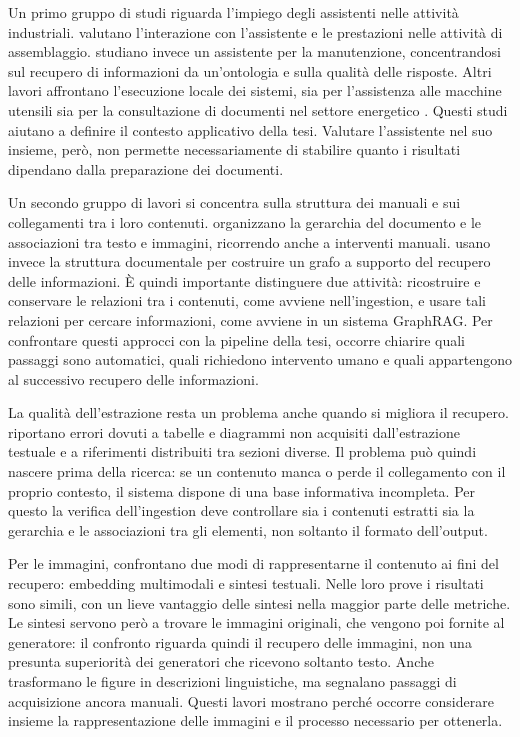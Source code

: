 Un primo gruppo di studi riguarda l'impiego degli assistenti nelle attività industriali. \textcite{colabianchi2024assessment} valutano l'interazione con l'assistente e le prestazioni nelle attività di assemblaggio. \textcite{ludwig2025ontology} studiano invece un assistente per la manutenzione, concentrandosi sul recupero di informazioni da un'ontologia e sulla qualità delle risposte. Altri lavori affrontano l'esecuzione locale dei sistemi, sia per l'assistenza alle macchine utensili sia per la consultazione di documenti nel settore energetico \parencite{cho2026onpremise,lee2025security}. Questi studi aiutano a definire il contesto applicativo della tesi. Valutare l'assistente nel suo insieme, però, non permette necessariamente di stabilire quanto i risultati dipendano dalla preparazione dei documenti.

Un secondo gruppo di lavori si concentra sulla struttura dei manuali e sui collegamenti tra i loro contenuti. \textcite{nam2025manual} organizzano la gerarchia del documento e le associazioni tra testo e immagini, ricorrendo anche a interventi manuali. \textcite{knollmeyer2025document} usano invece la struttura documentale per costruire un grafo a supporto del recupero delle informazioni. È quindi importante distinguere due attività: ricostruire e conservare le relazioni tra i contenuti, come avviene nell'ingestion, e usare tali relazioni per cercare informazioni, come avviene in un sistema GraphRAG. Per confrontare questi approcci con la pipeline della tesi, occorre chiarire quali passaggi sono automatici, quali richiedono intervento umano e quali appartengono al successivo recupero delle informazioni.

La qualità dell'estrazione resta un problema anche quando si migliora il recupero. \textcite{krainovskikh2026domain} riportano errori dovuti a tabelle e diagrammi non acquisiti dall'estrazione testuale e a riferimenti distribuiti tra sezioni diverse. Il problema può quindi nascere prima della ricerca: se un contenuto manca o perde il collegamento con il proprio contesto, il sistema dispone di una base informativa incompleta. Per questo la verifica dell'ingestion deve controllare sia i contenuti estratti sia la gerarchia e le associazioni tra gli elementi, non soltanto il formato dell'output.

Per le immagini, \textcite{riedler2024beyond} confrontano due modi di rappresentarne il contenuto ai fini del recupero: embedding multimodali e sintesi testuali. Nelle loro prove i risultati sono simili, con un lieve vantaggio delle sintesi nella maggior parte delle metriche. Le sintesi servono però a trovare le immagini originali, che vengono poi fornite al generatore: il confronto riguarda quindi il recupero delle immagini, non una presunta superiorità dei generatori che ricevono soltanto testo. Anche \textcite{amaram2026assistant} trasformano le figure in descrizioni linguistiche, ma segnalano passaggi di acquisizione ancora manuali. Questi lavori mostrano perché occorre considerare insieme la rappresentazione delle immagini e il processo necessario per ottenerla.

